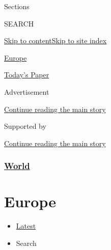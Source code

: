 Sections

SEARCH

\protect\hyperlink{site-content}{Skip to
content}\protect\hyperlink{site-index}{Skip to site index}

\href{https://www.nytimes3xbfgragh.onion/section/world/europe}{Europe}

\href{https://myaccount.nytimes3xbfgragh.onion/auth/login?response_type=cookie\&client_id=vi}{}

\href{https://www.nytimes3xbfgragh.onion/section/todayspaper}{Today's
Paper}

Advertisement

\protect\hyperlink{after-top}{Continue reading the main story}

Supported by

\protect\hyperlink{after-sponsor}{Continue reading the main story}

\hypertarget{world}{%
\subsubsection{\texorpdfstring{\href{/section/world}{World}}{World}}\label{world}}

\hypertarget{europe}{%
\section{Europe}\label{europe}}

\begin{itemize}
\tightlist
\item
  \protect\hyperlink{stream-panel}{Latest}
\item
  Search
\end{itemize}

